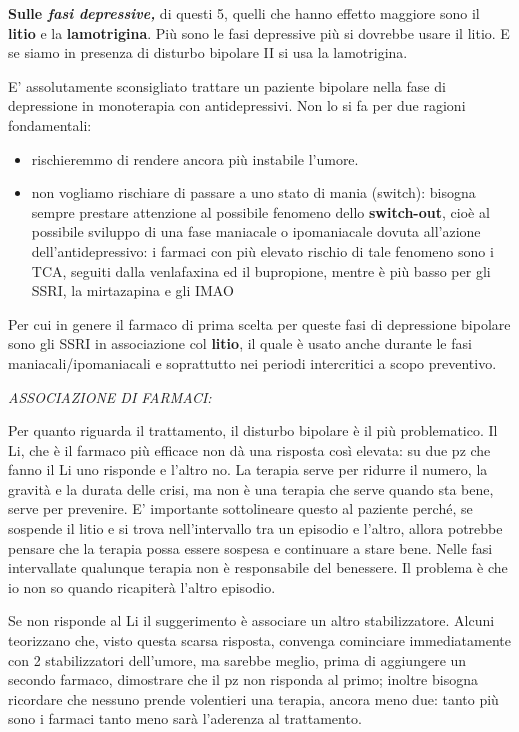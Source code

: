 \begin{itemize}
\textbf{Sulle \emph{fasi depressive,}} di questi 5, quelli che hanno
effetto maggiore sono il \textbf{litio} e la \textbf{lamotrigina}. Più
sono le fasi depressive più si dovrebbe usare il litio. E se siamo in
presenza di disturbo bipolare II si usa la lamotrigina.

E' assolutamente sconsigliato trattare un paziente bipolare nella fase
di depressione in monoterapia con antidepressivi. Non lo si fa per due
ragioni fondamentali:

\begin{itemize}
\item
  rischieremmo di rendere ancora più instabile l'umore.
\item
  non vogliamo rischiare di passare a uno stato di mania (switch): bisogna sempre prestare attenzione al possibile fenomeno dello
  \textbf{switch-out}, cioè al possibile sviluppo di una fase maniacale
  o ipomaniacale dovuta all'azione dell'antidepressivo: i farmaci con
  più elevato rischio di tale fenomeno sono i TCA, seguiti dalla
  venlafaxina ed il bupropione, mentre è più basso per gli SSRI, la
  mirtazapina e gli IMAO
\end{itemize}

Per cui in genere il farmaco di prima scelta per queste fasi di
depressione bipolare sono gli SSRI in associazione col \textbf{litio},
il quale è usato anche durante le fasi maniacali/ipomaniacali e
soprattutto nei periodi intercritici a scopo preventivo.

\emph{ASSOCIAZIONE DI FARMACI:}

Per quanto riguarda il trattamento, il disturbo bipolare è il più
problematico. Il Li, che è il farmaco più efficace non dà una risposta
così elevata: su due pz che fanno il Li uno risponde e l'altro no. La
terapia serve per ridurre il numero, la gravità e la durata delle crisi,
ma non è una terapia che serve quando sta bene, serve per prevenire. E'
importante sottolineare questo al paziente perché, se sospende il litio
e si trova nell'intervallo tra un episodio e l'altro, allora potrebbe
pensare che la terapia possa essere sospesa e continuare a stare bene.
Nelle fasi intervallate qualunque terapia non è responsabile del
benessere. Il problema è che io non so quando ricapiterà l'altro
episodio.

Se non risponde al Li il suggerimento è associare un altro
stabilizzatore. Alcuni teorizzano che, visto questa scarsa risposta,
convenga cominciare immediatamente con 2 stabilizzatori dell'umore, ma
sarebbe meglio, prima di aggiungere un secondo farmaco, dimostrare che
il pz non risponda al primo; inoltre bisogna ricordare che nessuno
prende volentieri una terapia, ancora meno due: tanto più sono i farmaci
tanto meno sarà l'aderenza al trattamento.


\end{itemize}
